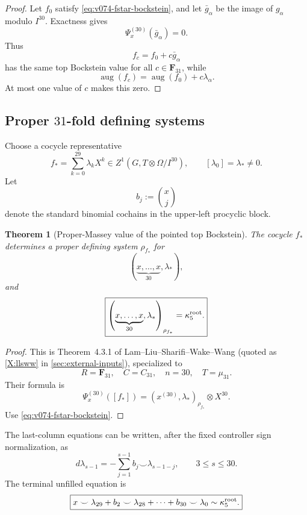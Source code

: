 \documentclass[11pt]{article}
\newtheorem{theorem}{Theorem}[section]
\theoremstyle{remark}
\begin{document}
\begin{proof}
Let \(f_0\) satisfy \eqref{eq:v074-fstar-bockstein}, and let
\(\bar g_\alpha\) be the image of \(g_\alpha\) modulo \(I^{30}\).
Exactness gives
\[
 \Psi_x^{(30)}(\bar g_\alpha)=0.
\]
Thus
\[
 f_c=f_0+c\bar g_\alpha
\]
has the same top Bockstein value for all \(c\in\mathbf F_{31}\), while
\[
 \operatorname{aug}(f_c)
 =
 \operatorname{aug}(f_0)+c\lambda_\alpha.
\]
At most one value of \(c\) makes this zero.
\end{proof}

\subsection{Proper \texorpdfstring{\(31\)}{31}-fold defining systems}

Choose a cocycle representative
\[
 f_*=\sum_{k=0}^{29}\lambda_kX^k
 \in Z^1(G,T\otimes\Omega/I^{30}),
 \qquad
 [\lambda_0]=\lambda_*\ne0.
\]
Let
\[
 b_j:=\binom{x}{j}
\]
denote the standard binomial cochains in the upper-left procyclic block.

\begin{theorem}[Proper-Massey value of the pointed top Bockstein]
\label{thm:v074-LLSWW-specialization}
The cocycle \(f_*\) determines a proper defining system
\(\rho_{f_*}\) for
\[
 \left(
 \underbrace{x,\ldots,x}_{30},
 \lambda_*
 \right),
\]
and
\begin{equation}
 \boxed{
 \left(
 \underbrace{x,\ldots,x}_{30},
 \lambda_*
 \right)_{\rho_{f_*}}
 =
 \kappa_5^{\rm root}.}
 \label{eq:v074-proper-31fold}
\end{equation}
\end{theorem}

\begin{proof}
This is Theorem~4.3.1 of Lam--Liu--Sharifi--Wake--Wang \cite{LLSWW}
(quoted as \ref{X:llsww} in \cref{sec:external-inputs}), specialized to
\[
 R=\mathbf F_{31},
 \quad C=C_{31},
 \quad n=30,
 \quad T=\mu_{31}.
\]
Their formula is
\[
 \Psi_x^{(30)}([f_*])
 =
 \left(
 x^{(30)},\lambda_*
 \right)_{\rho_{f_*}}
 \otimes X^{30}.
\]
Use \eqref{eq:v074-fstar-bockstein}.
\end{proof}

The last-column equations can be written, after the fixed controller sign
normalization, as
\begin{equation}
 \boxed{
 d\lambda_{s-1}
 =
 -\sum_{j=1}^{s-1}
 b_j\smile\lambda_{s-1-j},
 \qquad
 3\le s\le30.}
 \label{eq:v074-last-column-recursion}
\end{equation}
The terminal unfilled equation is
\begin{equation}
 \boxed{
 x\smile\lambda_{29}
 +b_2\smile\lambda_{28}
 +\cdots
 +b_{30}\smile\lambda_0
 \sim
 \kappa_5^{\rm root}.}
 \label{eq:v074-terminal-massey-cochain}
\end{equation}
\end{document}
